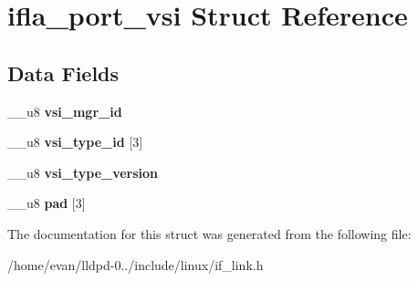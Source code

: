 \section{ifla\-\_\-port\-\_\-vsi \-Struct \-Reference}
\label{structifla__port__vsi}
\subsection*{\-Data \-Fields}
\begin{DoxyCompactItemize}
\item 
\-\_\-\-\_\-u8 {\bfseries vsi\-\_\-mgr\-\_\-id}\label{structifla__port__vsi_a11da2464036c59f85ed6f7f8fbdf110a}

\item 
\-\_\-\-\_\-u8 {\bfseries vsi\-\_\-type\-\_\-id} [3]\label{structifla__port__vsi_af7a0d8521bfb4b5bd74f74e74212b4ec}

\item 
\-\_\-\-\_\-u8 {\bfseries vsi\-\_\-type\-\_\-version}\label{structifla__port__vsi_a89a88405125fba7ae9415c9beb66c5e8}

\item 
\-\_\-\-\_\-u8 {\bfseries pad} [3]\label{structifla__port__vsi_a7d47b0b77eabec224d4bff9ddbf22841}

\end{DoxyCompactItemize}


\-The documentation for this struct was generated from the following file\-:\begin{DoxyCompactItemize}
\item 
/home/evan/lldpd-\/0../include/linux/if\-\_\-link.\-h\end{DoxyCompactItemize}

